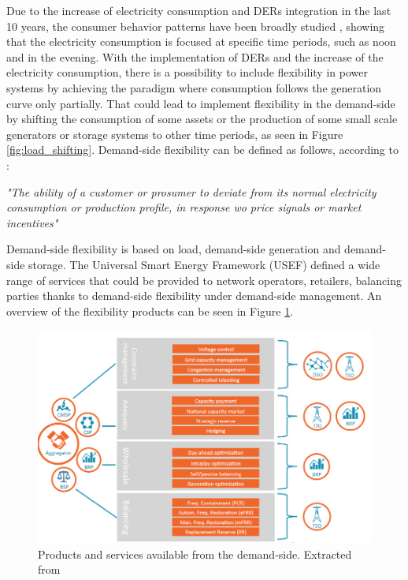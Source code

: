 Due to the increase of electricity consumption and DERs integration in the last 10 years, the consumer behavior patterns have been broadly studied \cite{ZHOU201773,TORRITI2014265}, showing that the electricity consumption is focused at specific time periods, such as noon and in the evening. With the implementation of DERs and the increase of the electricity consumption, there is a possibility to include flexibility in power systems by achieving the paradigm where consumption follows the generation curve only partially. That could lead to implement flexibility in the demand-side by shifting the consumption of some assets or the production of some small scale generators or storage systems to other time periods, as seen in Figure \ref{fig:load_shifting}. Demand-side flexibility can be defined as follows, according to \cite{EuropeanSmartGridsTaskForceExpertGroup32019}:  

\begin{tcolorbox}
\textit{"The ability of a customer or prosumer to deviate from its normal electricity consumption or production profile, in response wo price signals or market incentives"} 
\end{tcolorbox}

Demand-side flexibility is based on load, demand-side generation and demand-side storage. The Universal Smart Energy Framework (USEF) defined a wide range of services that could be provided to network operators, retailers, balancing parties thanks to demand-side flexibility under demand-side management. An overview of the flexibility products can be seen in Figure \ref{fig:DSF}. 

\begin{figure}[h]
	\centering 
	\includegraphics[width=1\columnwidth ]{ChapterIntro/Figures/USEF_DSF.png}
		\caption{Products and services available from the demand-side. Extracted from \cite{USEFFoundation2015a}}  
		\label{fig:DSF}
\end{figure}


